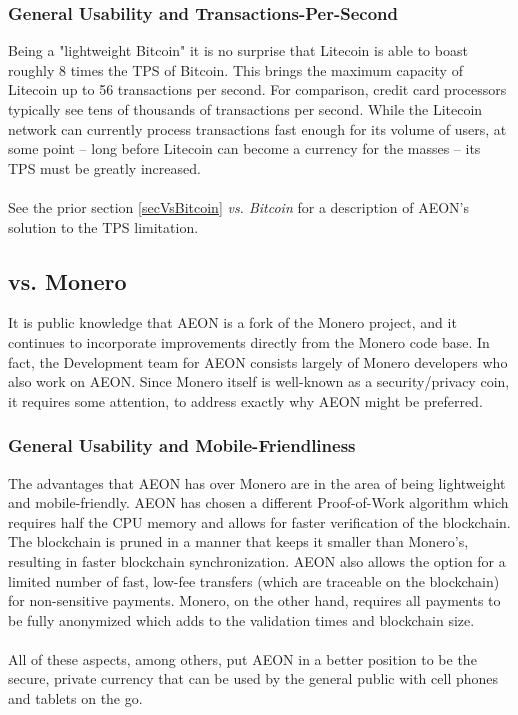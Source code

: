 \subsubsection{General Usability and Transactions-Per-Second}
Being a "lightweight Bitcoin" it is no surprise that Litecoin is able to boast roughly 8 times the TPS of Bitcoin.  This brings the maximum capacity of Litecoin up to 56 transactions per second. For comparison, credit card processors typically see tens of thousands of transactions per second. While the Litecoin network can currently process transactions fast enough for its volume of users, at some point -- long before Litecoin can become a currency for the masses -- its TPS must be greatly increased.\\
\\
See the prior section \ref{secVsBitcoin} \textit{vs. Bitcoin} for a description of AEON's solution to the TPS limitation.

\subsection{vs. Monero}
It is public knowledge that AEON is a fork of the Monero project, and it continues to incorporate improvements directly from the Monero code base.  In fact, the Development team for AEON consists largely of Monero developers who also work on AEON.  Since Monero itself is well-known as a security/privacy coin, it requires some attention, to address exactly why AEON might be preferred.

\subsubsection{General Usability and Mobile-Friendliness}
The advantages that AEON has over Monero are in the area of being lightweight and mobile-friendly.  AEON has chosen a different Proof-of-Work algorithm which requires half the CPU memory and allows for faster verification of the blockchain.  The blockchain is pruned in a manner that keeps it smaller than Monero's, resulting in faster blockchain synchronization.  AEON also allows the option for a limited number of fast, low-fee transfers (which are traceable on the blockchain) for non-sensitive payments.  Monero, on the other hand, requires all payments to be fully anonymized which adds to the validation times and blockchain size.\\
\\
All of these aspects, among others, put AEON in a better position to be the secure, private currency that can be used by the general public with cell phones and tablets on the go.

